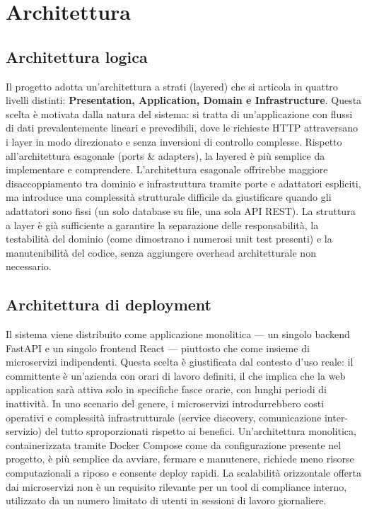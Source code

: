 \documentclass[a4paper,12pt]{article}
\begin{document}
    \newpage

    \section{Architettura}
        \subsection{Architettura logica}
            Il progetto adotta un'architettura a strati (layered) che si articola in quattro livelli distinti: \textbf{Presentation, Application, Domain e Infrastructure}. Questa scelta è motivata dalla natura del sistema: si tratta di un'applicazione con flussi di dati prevalentemente lineari e prevedibili, dove le richieste HTTP attraversano i layer in modo direzionato e senza inversioni di controllo complesse. Rispetto all'architettura esagonale (ports \& adapters), la layered è più semplice da implementare e comprendere. L'architettura esagonale offrirebbe maggiore disaccoppiamento tra dominio e infrastruttura tramite porte e adattatori espliciti, ma introduce una complessità strutturale difficile da giustificare quando gli adattatori sono fissi (un solo database su file, una sola API REST). La struttura a layer è già sufficiente a garantire la separazione delle responsabilità, la testabilità del dominio (come dimostrano i numerosi unit test presenti) e la manutenibilità del codice, senza aggiungere overhead architetturale non necessario.
        \subsection{Architettura di deployment}
            Il sistema viene distribuito come applicazione monolitica — un singolo backend FastAPI e un singolo frontend React — piuttosto che come insieme di microservizi indipendenti. Questa scelta è giustificata dal contesto d'uso reale: il committente è un'azienda con orari di lavoro definiti, il che implica che la web application sarà attiva solo in specifiche fasce orarie, con lunghi periodi di inattività. In uno scenario del genere, i microservizi introdurrebbero costi operativi e complessità infrastrutturale (service discovery, comunicazione inter-servizio) del tutto sproporzionati rispetto ai benefici. Un'architettura monolitica, containerizzata tramite Docker Compose come da configurazione presente nel progetto, è più semplice da avviare, fermare e manutenere, richiede meno risorse computazionali a riposo e consente deploy rapidi. La scalabilità orizzontale offerta dai microservizi non è un requisito rilevante per un tool di compliance interno, utilizzato da un numero limitato di utenti in sessioni di lavoro giornaliere.
\end{document}
